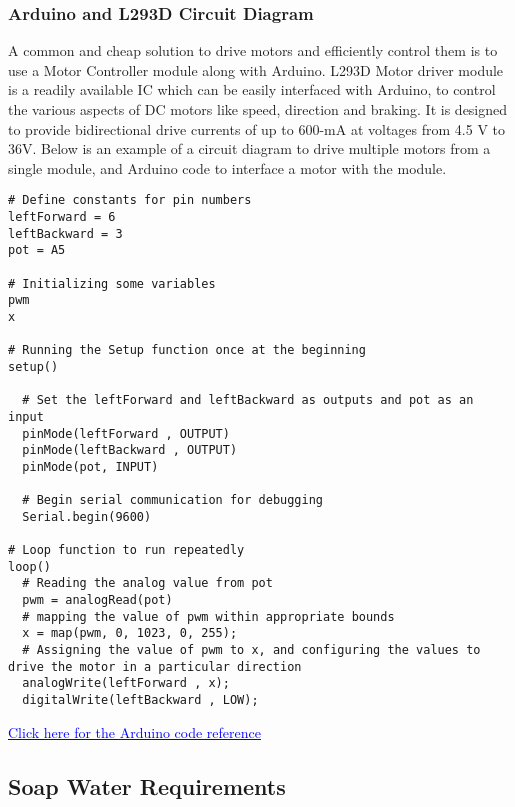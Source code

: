 \documentclass[table,french,english]{rapportCS}
\begin{document}
\subsubsection{Arduino and L293D Circuit Diagram}\label{sec:adriono}
A common and cheap solution to drive motors and efficiently control them is to use a Motor \gls{Controller}  module along with Arduino. L293D Motor driver module is a readily available IC which can be easily interfaced with Arduino, to control the various aspects of DC motors like speed, direction and braking. It is designed to provide bidirectional drive currents of up to 600-mA at voltages from 4.5 V to 36V.
Below is an example of a circuit diagram to drive multiple motors from a single module, and Arduino code to interface a motor with the module.


\begin{lstlisting}
# Define constants for pin numbers
leftForward = 6
leftBackward = 3
pot = A5

# Initializing some variables
pwm
x

# Running the Setup function once at the beginning
setup() 

  # Set the leftForward and leftBackward as outputs and pot as an input
  pinMode(leftForward , OUTPUT)
  pinMode(leftBackward , OUTPUT)
  pinMode(pot, INPUT)

  # Begin serial communication for debugging
  Serial.begin(9600)

# Loop function to run repeatedly
loop()
  # Reading the analog value from pot
  pwm = analogRead(pot)
  # mapping the value of pwm within appropriate bounds
  x = map(pwm, 0, 1023, 0, 255);
  # Assigning the value of pwm to x, and configuring the values to drive the motor in a particular direction 
  analogWrite(leftForward , x);
  digitalWrite(leftBackward , LOW);
\end{lstlisting}
\item \href{https://github.com/naunidhsingh03/ELP305-TribeD-Resources/blob/5ba1988fe283faba21ba7098978bb225e509d5cb/Codes/final_roller.ino}
{\textcolor{blue}{Click here for the Arduino code reference}}

\subsection{Soap Water Requirements}
\end{document}
